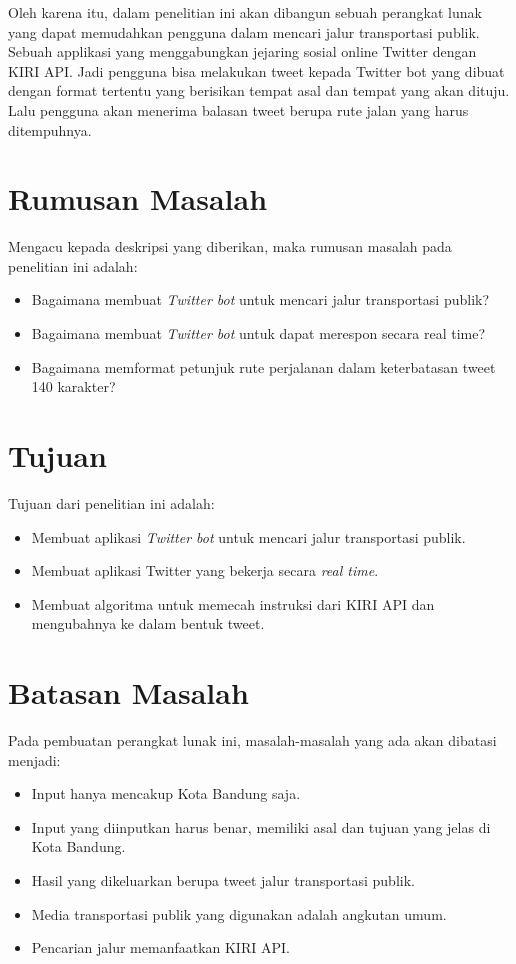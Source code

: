 Oleh karena itu, dalam penelitian ini akan dibangun sebuah perangkat lunak yang dapat memudahkan pengguna dalam mencari jalur transportasi publik. Sebuah applikasi yang menggabungkan jejaring sosial online Twitter dengan KIRI API. Jadi pengguna bisa melakukan tweet kepada Twitter bot yang dibuat dengan format tertentu yang berisikan tempat asal dan tempat yang akan dituju. Lalu pengguna akan menerima balasan tweet berupa rute jalan yang harus ditempuhnya.

\section{Rumusan Masalah}
Mengacu kepada deskripsi yang diberikan, maka rumusan masalah pada penelitian ini adalah:
\begin{itemize}
	\item Bagaimana membuat \textit{Twitter bot} untuk mencari jalur transportasi publik?
	\item Bagaimana membuat \textit{Twitter bot} untuk dapat merespon secara real time?
	\item Bagaimana memformat petunjuk rute perjalanan dalam keterbatasan tweet 140 karakter?
\end{itemize}

\section{Tujuan}
Tujuan dari penelitian ini adalah:
\begin{itemize}
	\item Membuat aplikasi \textit{Twitter bot} untuk mencari jalur transportasi publik.
	\item Membuat aplikasi Twitter yang bekerja secara \textit{real time}.
	\item Membuat algoritma untuk memecah instruksi dari KIRI API dan mengubahnya ke dalam bentuk tweet.
\end{itemize}

\section{Batasan Masalah}
Pada pembuatan perangkat lunak ini, masalah-masalah yang ada akan dibatasi menjadi:
\begin{itemize}
	\item Input hanya mencakup Kota Bandung saja.
	\item Input yang diinputkan harus benar, memiliki asal dan tujuan yang jelas di Kota Bandung.
	\item Hasil yang dikeluarkan berupa tweet jalur transportasi publik.
	\item Media transportasi publik yang digunakan adalah angkutan umum.
	\item Pencarian jalur memanfaatkan KIRI API.
\end{itemize}


